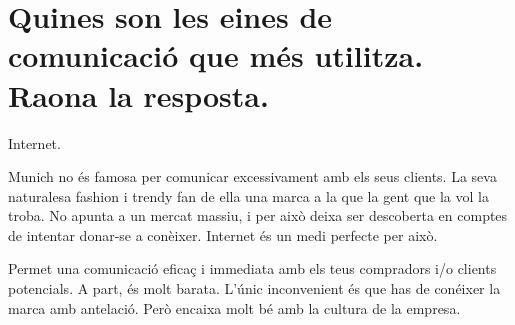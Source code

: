 \section{Quines son les eines de comunicació 
que més utilitza. Raona la resposta.}

Internet.

Munich no és famosa per comunicar excessivament amb els seus clients. La seva
naturalesa fashion i trendy fan de ella una marca a la que la gent que la vol
la troba. No apunta a un mercat massiu, i per això deixa ser descoberta en 
comptes de intentar donar-se a conèixer. Internet és un medi perfecte per això.

Permet una comunicació eficaç i immediata amb els teus compradors i/o clients
potencials. A part, és molt barata. L'únic inconvenient és que has de conéixer
la marca amb antelació. Però encaixa molt bé amb la cultura de la empresa.
